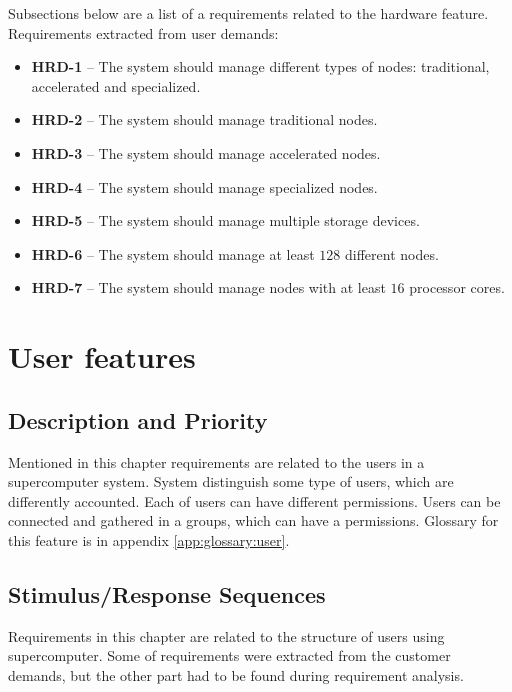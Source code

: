\documentclass{report}
\begin{document}
Subsections below are a list of a requirements related to the hardware feature.
Requirements extracted from user demands:
\begin{itemize}
	\item
	{
		\textbf{HRD-1} -- The system should manage different types of nodes: traditional, accelerated and specialized.	
	}
	\item
	{
		\textbf{HRD-2} -- The system should manage traditional nodes.
	}
	\item
	{
		\textbf{HRD-3} -- The system should manage accelerated nodes.
	}
	\item
	{
		\textbf{HRD-4} -- The system should manage specialized nodes.
	}
	\item
	{
		\textbf{HRD-5} -- The system should manage multiple storage devices.
	}
	\item
	{
		\textbf{HRD-6} -- The system should manage at least $128$ different nodes.
	}
	\item
	{
		\textbf{HRD-7} -- The system should manage nodes with at least $16$ processor cores.
	}
\end{itemize}


\section{User features}

\subsection{Description and Priority}
Mentioned in this chapter requirements are related to the users in a supercomputer system. System distinguish some type of users, which are differently accounted. Each of users can have different permissions. Users can be connected and gathered in a groups, which can have a permissions. 
Glossary for this feature is in appendix \ref{app:glossary:user}.

\subsection{Stimulus/Response Sequences}
Requirements in this chapter are related to the structure of users using supercomputer. Some of requirements were extracted from the customer demands, but the other part had to be found during requirement analysis.
\end{document}
